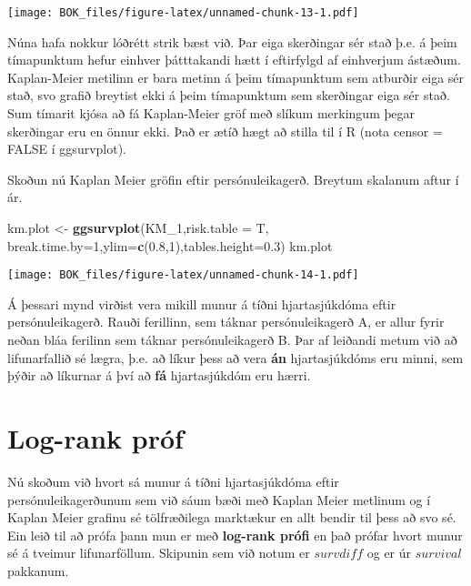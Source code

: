 \documentclass[
]{book}
\newenvironment{Shaded}{\begin{snugshade}}{\end{snugshade}}
\newcommand{\DataTypeTok}[1]{\textcolor[rgb]{0.13,0.29,0.53}{#1}}
\newcommand{\DecValTok}[1]{\textcolor[rgb]{0.00,0.00,0.81}{#1}}
\newcommand{\FloatTok}[1]{\textcolor[rgb]{0.00,0.00,0.81}{#1}}
\newcommand{\KeywordTok}[1]{\textcolor[rgb]{0.13,0.29,0.53}{\textbf{#1}}}
\newcommand{\NormalTok}[1]{#1}
\newcommand{\StringTok}[1]{\textcolor[rgb]{0.31,0.60,0.02}{#1}}
\begin{document}
\texttt{[image: BOK\_files/figure-latex/unnamed-chunk-13-1.pdf]}

Núna hafa nokkur lóðrétt strik bæst við. Þar eiga skerðingar sér stað þ.e. á þeim tímapunktum hefur einhver þátttakandi hætt í eftirfylgd af einhverjum ástæðum. Kaplan-Meier metilinn er bara metinn á þeim tímapunktum sem atburðir eiga sér stað, svo grafið breytist ekki á þeim tímapunktum sem skerðingar eiga sér stað. Sum tímarit kjósa að fá Kaplan-Meier gröf með slíkum merkingum þegar skerðingar eru en önnur ekki. Það er ætíð hægt að stilla til í R (nota censor = FALSE í ggsurvplot).

Skoðun nú Kaplan Meier gröfin eftir persónuleikagerð. Breytum skalanum aftur í ár.

\begin{Shaded}
\begin{Highlighting}[]
\NormalTok{km.plot <-}\StringTok{ }\KeywordTok{ggsurvplot}\NormalTok{(KM_}\DecValTok{1}\NormalTok{,}\DataTypeTok{risk.table =}\NormalTok{ T,}
                        \DataTypeTok{break.time.by=}\DecValTok{1}\NormalTok{,}\DataTypeTok{ylim=}\KeywordTok{c}\NormalTok{(}\FloatTok{0.8}\NormalTok{,}\DecValTok{1}\NormalTok{),}\DataTypeTok{tables.height=}\FloatTok{0.3}\NormalTok{) }
\NormalTok{km.plot}
\end{Highlighting}
\end{Shaded}

\texttt{[image: BOK\_files/figure-latex/unnamed-chunk-14-1.pdf]}

Á þessari mynd virðist vera mikill munur á tíðni hjartasjúkdóma eftir persónuleikagerð. Rauði ferillinn, sem táknar persónuleikagerð A, er allur fyrir neðan bláa ferilinn sem táknar persónuleikagerð B. Þar af leiðandi metum við að lifunarfallið sé lægra, þ.e. að líkur þess að vera \textbf{án} hjartasjúkdóms eru minni, sem þýðir að líkurnar á því að \textbf{fá} hjartasjúkdóm eru hærri.

\hypertarget{log-rank-pruxf3f}{%
\section{Log-rank próf}\label{log-rank-pruxf3f}}

Nú skoðum við hvort sá munur á tíðni hjartasjúkdóma eftir persónuleikagerðunum sem við sáum bæði með Kaplan Meier metlinum og í Kaplan Meier grafinu sé tölfræðilega marktækur en allt bendir til þess að svo sé. Ein leið til að prófa þann mun er með \textbf{log-rank prófi} en það prófar hvort munur sé á tveimur lifunarföllum. Skipunin sem við notum er \(survdiff\) og er úr \(survival\) pakkanum.
\end{document}
